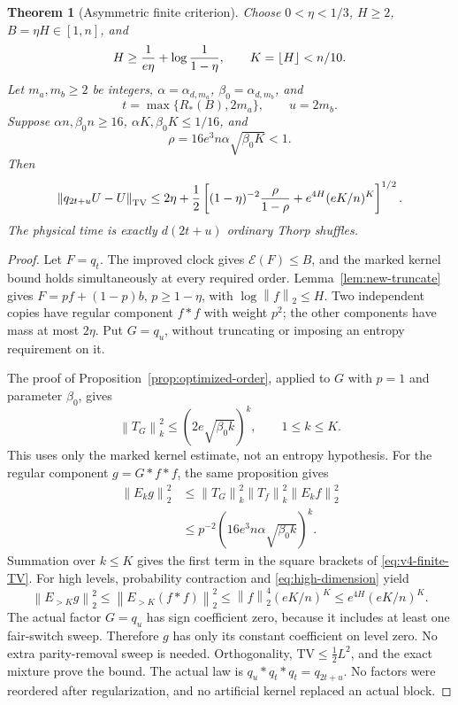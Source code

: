 \documentclass[11pt]{article}
\numberwithin{equation}{section}
\newtheorem{theorem}{Theorem}[section]
\theoremstyle{definition}\newtheorem{definition}[theorem]{Definition}
\theoremstyle{remark}\newtheorem{remark}[theorem]{Remark}
\newcommand{\Ent}{\mathcal E}
\newcommand{\TV}{\mathrm{TV}}
\newcommand{\norm}[1]{\left\lVert#1\right\rVert}
\begin{document}
\begin{theorem}[Asymmetric finite criterion]\label{thm:v4-finite}
Choose $0<\eta<1/3$, $H\ge2$, $B=\eta H\in[1,n]$, and
\[
 H\ge{1\over e\eta}+\log{1\over1-\eta},\qquad K=\lfloor H\rfloor<n/10.
\]
Let $m_a,m_b\ge2$ be integers, $\alpha=\alpha_{d,m_a}$,
$\beta_0=\alpha_{d,m_b}$, and
\[
 t=\max\{R_*(B),2m_a\},\qquad u=2m_b.
\]
Suppose $\alpha n,\beta_0n\ge16$, $\alpha K,\beta_0K\le1/16$, and
\[
 \rho=16e^3n\alpha\sqrt{\beta_0K}<1.
\]
Then
\begin{equation}\label{eq:v4-finite-TV}
 \norm{q_{2t+u}U-U}_{\TV}\le2\eta+\frac12\left[
 (1-\eta)^{-2}{\rho\over1-\rho}
                 +e^{4H}(eK/n)^K\right]^{1/2}.
\end{equation}
The physical time is exactly $d(2t+u)$ ordinary Thorp shuffles.
\end{theorem}
\begin{proof}
Let $F=q_t$. The improved clock gives $\Ent(F)\le B$, and the marked
kernel bound holds simultaneously at every required order.
Lemma~\ref{lem:new-truncate} gives $F=pf+(1-p)b$, $p\ge1-\eta$, with
$\log\norm f_2\le H$. Two independent copies have regular component
$f*f$ with weight $p^2$; the other components have mass at most $2\eta$.
Put $G=q_u$, without truncating or imposing an entropy requirement on it.

The proof of Proposition~\ref{prop:optimized-order}, applied to $G$ with
$p=1$ and parameter $\beta_0$, gives
\[
 \norm{T_G}_k^2\le(2e\sqrt{\beta_0 k})^k,\qquad1\le k\le K.
\]
This uses only the marked kernel estimate, not an entropy hypothesis.
For the regular component $g=G*f*f$, the same proposition gives
\begin{align*}
 \norm{E_k g}_2^2
 &\le\norm{T_G}_k^2\norm{T_f}_k^2\norm{E_kf}_2^2\\
 &\le p^{-2}(16e^3n\alpha\sqrt{\beta_0 k})^k.
\end{align*}
Summation over $k\le K$ gives the first term in the square brackets of
\eqref{eq:v4-finite-TV}. For high levels, probability contraction and
\eqref{eq:high-dimension} yield
\[
 \norm{E_{>K}g}_2^2\le\norm{E_{>K}(f*f)}_2^2
           \le\norm f_2^4(eK/n)^K\le e^{4H}(eK/n)^K.
\]
The actual factor $G=q_u$ has sign coefficient zero, because it includes
at least one fair-switch sweep. Therefore $g$ has only its constant
coefficient on level zero. No extra parity-removal sweep is needed.
Orthogonality, $\TV\le\tfrac12L^2$, and the exact mixture prove the
bound. The actual law is $q_u*q_t*q_t=q_{2t+u}$. No factors were
reordered after regularization, and no artificial kernel replaced an
actual block.
\end{proof}
\end{document}
